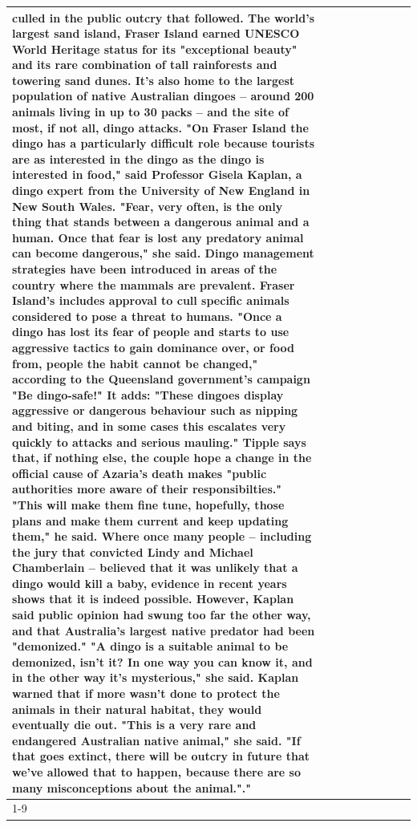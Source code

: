 \begin{table}[H]
\begin{tabular}{lllrlllll}
culled in the public outcry that followed. The world's largest sand island, Fraser Island earned UNESCO World Heritage status for its "exceptional beauty" and its rare combination of tall rainforests and towering sand dunes. It's also home to the largest population of native Australian dingoes -- around 200 animals living in up to 30 packs -- and the site of most, if not all, dingo attacks. "On Fraser Island the dingo has a particularly difficult role because tourists are as interested in the dingo as the dingo is interested in food," said Professor Gisela Kaplan, a dingo expert from the University of New England in New South Wales. "Fear, very often, is the only thing that stands between a dangerous animal and a human. Once that fear is lost any predatory animal can become dangerous," she said. Dingo management strategies have been introduced in areas of the country where the mammals are prevalent. Fraser Island's includes approval to cull specific animals considered to pose a threat to humans. "Once a dingo has lost its fear of people and starts to use aggressive tactics to gain dominance over, or food from, people the habit cannot be changed," according to the Queensland government's campaign "Be dingo-safe!" It adds: "These dingoes display aggressive or dangerous behaviour such as nipping and biting, and in some cases this escalates very quickly to attacks and serious mauling." Tipple says that, if nothing else, the couple hope a change in the official cause of Azaria's death makes "public authorities more aware of their responsibilties." "This will make them fine tune, hopefully, those plans and make them current and keep updating them," he said. Where once many people -- including the jury that convicted Lindy and Michael Chamberlain -- believed that it was unlikely that a dingo would kill a baby, evidence in recent years shows that it is indeed possible. However, Kaplan said public opinion had swung too far the other way, and that Australia's largest native predator had been "demonized." "A dingo is a suitable animal to be demonized, isn't it? In one way you can know it, and in the other way it's mysterious," she said. Kaplan warned that if more wasn't done to protect the animals in their natural habitat, they would eventually die out. "This is a very rare and endangered Australian native animal," she said. "If that goes extinct, there will be outcry in future that we've allowed that to happen, because there are so many misconceptions about the animal."." \\
\cline{1-9}

\end{tabular}
\end{table}
